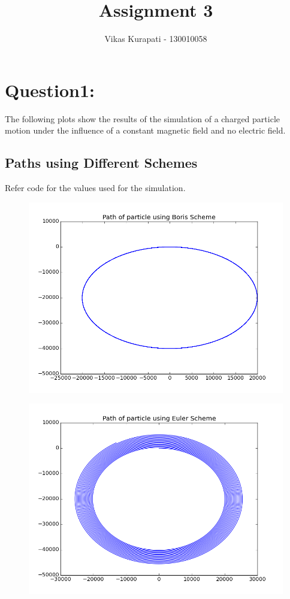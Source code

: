 \documentclass[11pt, a4paper]{article}
\title{\textbf{Assignment 3}}
\author{Vikas Kurapati - 130010058}
\begin{document}
\maketitle
\newpage
\section{Question1:}
The following plots show the results of the simulation of a charged particle motion under the influence of a constant magnetic field and no electric field.
\subsection{Paths using Different Schemes}
Refer code for the values used for the simulation.
\begin{figure}[H]
 \centering
 \includegraphics[width = \textwidth]{q1_path_boris.png}
\end{figure}
\begin{figure}[H]
 \centering
 \includegraphics[width = \textwidth]{q1_path_euler.png}
\end{figure}
\end{document}
